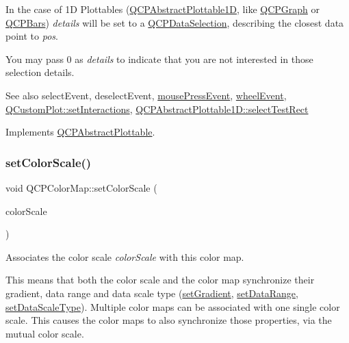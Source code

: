 In the case of 1D Plottables (\hyperlink{classQCPAbstractPlottable1D}{Q\+C\+P\+Abstract\+Plottable1D}, like \hyperlink{classQCPGraph}{Q\+C\+P\+Graph} or \hyperlink{classQCPBars}{Q\+C\+P\+Bars}) {\itshape details} will be set to a \hyperlink{classQCPDataSelection}{Q\+C\+P\+Data\+Selection}, describing the closest data point to {\itshape pos}.

You may pass 0 as {\itshape details} to indicate that you are not interested in those selection details.

\begin{DoxySeeAlso}{See also}
select\+Event, deselect\+Event, \hyperlink{classQCPLayerable_af6567604818db90f4fd52822f8bc8376}{mouse\+Press\+Event}, \hyperlink{classQCPLayerable_a47dfd7b8fd99c08ca54e09c362b6f022}{wheel\+Event}, \hyperlink{classQCustomPlot_a5ee1e2f6ae27419deca53e75907c27e5}{Q\+Custom\+Plot\+::set\+Interactions}, \hyperlink{classQCPAbstractPlottable1D_a22377bf6e57ab7eedbc9e489250c6ded}{Q\+C\+P\+Abstract\+Plottable1\+D\+::select\+Test\+Rect} 
\end{DoxySeeAlso}


Implements \hyperlink{classQCPAbstractPlottable_addb3f5c41f007a78c3e142cc605bc712}{Q\+C\+P\+Abstract\+Plottable}.

\mbox{\label{classQCPColorMap_aa828921db364fe3c6af4619580ab85fd}} 
\subsubsection{\texorpdfstring{set\+Color\+Scale()}{setColorScale()}}
{\footnotesize\ttfamily void Q\+C\+P\+Color\+Map\+::set\+Color\+Scale (\begin{DoxyParamCaption}\item[{\hyperlink{classQCPColorScale}{Q\+C\+P\+Color\+Scale} $\ast$}]{color\+Scale }\end{DoxyParamCaption})}

Associates the color scale {\itshape color\+Scale} with this color map.

This means that both the color scale and the color map synchronize their gradient, data range and data scale type (\hyperlink{classQCPColorMap_a7313c78360471cead3576341a2c50377}{set\+Gradient}, \hyperlink{classQCPColorMap_a980b42837821159786a85b4b7dcb8774}{set\+Data\+Range}, \hyperlink{classQCPColorMap_a9d20aa08e3c1f20f22908c45b9c06511}{set\+Data\+Scale\+Type}). Multiple color maps can be associated with one single color scale. This causes the color maps to also synchronize those properties, via the mutual color scale.

